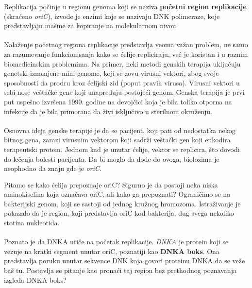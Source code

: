 Replikacija počinje u regionu genoma koji se naziva \textbf{početni region replikacije} (skraćeno \textit{oriC}), izvode je enzimi koje se nazivaju DNK polimeraze, koje predstavljaju mašine za kopiranje na molekularnom nivou.\\\\
Nalaženje početnog regiona replikacije predstavlja veoma važan problem, ne samo za razumevanje funkcionisanja kako se ćelije repliciraju, već je koristan i u raznim biomedicinskim problemima. Na primer, neki metodi genskih terapija uključuju genetski izmenjene mini genome, koji se zovu virusni vektori, zbog svoje sposobnosti da prodru kroz ćelijski zid (poput pravih virusa). Virusni vektori u sebi nose veštačke gene koji unapređuju postojeći genom. Genska terapija je prvi put uspešno izvršena 1990. godine na devojčici koja je bila toliko otporna na infekcije da je bila primorana da živi isključivo u sterilnom okruženju.
\\
\\
Osnovna ideja genske terapije je da se pacijent, koji pati od nedostatka nekog bitnog gena, zarazi virusnim vektorom koji sadrži veštački gen koji enkodira terapeutski protein. Jednom kad je unutar ćelije, vektor se replicira, što dovodi do lečenja bolesti pacijenta. Da bi moglo da dođe do ovoga, biolozima je neophodno da znaju gde je \textit{oriC}.

Pitamo se kako ćelija prepoznaje oriC? Sigurno je da postoji neka niska aminokiselina koja označava oriC, ali kako ga prepoznati? Ograničimo se na bakterijski genom, koji se sastoji od jednog kružnog hromozoma. Istraživanje je pokazalo da je region, koji predstavlja oriC kod bakterija,
dug svega nekoliko stotina nukleotida.
\\
\\

Poznato je da DNKA utiče na početak replikacije. \textit{DNKA} je protein koji se vezuje na kratki segment unutar oriC, poznatiji kao \textbf{DNKA boks}. Ona predstavlja poruku unutar sekvence DNK koja govori proteinu DNKA da se veže baš tu. Postavlja se pitanje kao pronaći taj region bez prethodnog poznavanja izgleda DNKA boks? \\\\

